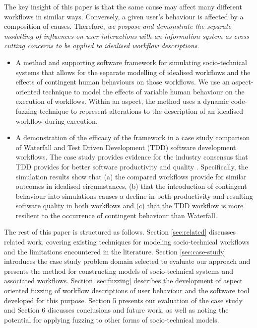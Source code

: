 \documentclass{llncs}
\begin{document}

The key insight of this paper is that the same cause may affect many different workflows in similar ways.  Conversely, a
given user's behaviour is affected by a composition of causes.  Therefore, \emph{we propose and demonstrate the separate
  modelling of influences on user interactions with an information system as cross cutting concerns to be applied to
  idealised workflow descriptions}.

\begin{itemize}

\item A method and supporting software framework for simulating socio-technical systems that allows for the separate
  modelling of idealised workflows and the effects of contingent human behaviours on those workflows.  We use an
  aspect-oriented technique \citep{filman01aspect} to model the effects of variable human behaviour on the execution of
  workflows.  Within an aspect, the method uses a dynamic code-fuzzing \citep{takanen08fuzzing} technique to represent
  alterations to the description of an idealised workflow during execution.

\item A demonstration of the efficacy of the framework in a case study comparison of Waterfall and Test Driven
  Development (TDD) software development workflows.  The case study provides evidence for the industry consensus that
  TDD provides for better software productivity and quality
  \citep{Bhat2006TestDrivenDevelopment,George2004TestDrivenDevelopment,Huang2009EmpiricalTestFirstProgramming}.
  Specifically, the simulation results show that (a) the compared workflows provide for similar outcomes in idealised
  circumstances, (b) that the introduction of contingent behaviour into simulations causes a decline in both
  productivity and resulting software quality in both workflows and (c) that the TDD workflow is more resilient to the
  occurrence of contingent behaviour than Waterfall.

\end{itemize}

The rest of this paper is structured as follows.  Section \ref{sec:related} discusses related work, covering existing
techniques for modeling socio-technical workflows and the limitations encountered in the literature.  Section
\ref{sec:case-study} introduces the case study problem domain selected to evaluate our approach and presents the method
for constructing models of socio-technical systems and associated workflows. Section \ref{sec:fuzzing} describes the
development of aspect oriented fuzzing of workflow descriptions of user behaviour and the software tool developed for
this purpose.  Section 5 presents our evaluation of the case study and Section 6 discusses conclusions and future work,
as well as noting the potential for applying fuzzing to other forms of socio-technical models.
\end{document}
